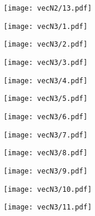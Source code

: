 \documentclass{article}
\begin{document}
\begin{figure}[H]
\centering
\begin{subfigure}{.49\textwidth}
\texttt{[image: vecN2/13.pdf]}
\end{subfigure}
\begin{subfigure}{.49\textwidth}
\texttt{[image: vecN3/1.pdf]}
\end{subfigure}
\end{figure}
\begin{figure}[H]
\centering
\begin{subfigure}{.49\textwidth}
\texttt{[image: vecN3/2.pdf]}
\end{subfigure}
\begin{subfigure}{.49\textwidth}
\texttt{[image: vecN3/3.pdf]}
\end{subfigure}
\end{figure}
\begin{figure}[H]
\centering
\begin{subfigure}{.49\textwidth}
\texttt{[image: vecN3/4.pdf]}
\end{subfigure}
\begin{subfigure}{.49\textwidth}
\texttt{[image: vecN3/5.pdf]}
\end{subfigure}
\end{figure}
\begin{figure}[H]
\centering
\begin{subfigure}{.49\textwidth}
\texttt{[image: vecN3/6.pdf]}
\end{subfigure}
\begin{subfigure}{.49\textwidth}
\texttt{[image: vecN3/7.pdf]}
\end{subfigure}
\end{figure}
\begin{figure}[H]
\centering
\begin{subfigure}{.49\textwidth}
\texttt{[image: vecN3/8.pdf]}
\end{subfigure}
\begin{subfigure}{.49\textwidth}
\texttt{[image: vecN3/9.pdf]}
\end{subfigure}
\end{figure}
\begin{figure}[H]
\centering
\begin{subfigure}{.49\textwidth}
\texttt{[image: vecN3/10.pdf]}
\end{subfigure}
\begin{subfigure}{.49\textwidth}
\texttt{[image: vecN3/11.pdf]}
\end{subfigure}
\end{figure}
\end{document}
